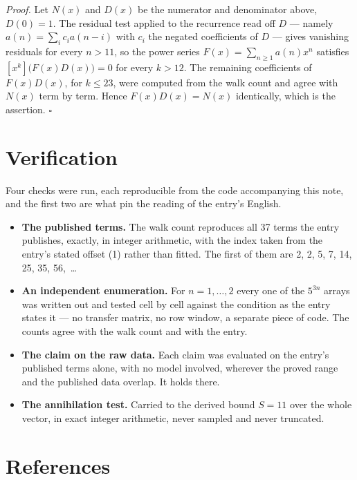 \documentclass[11pt]{article}
\theoremstyle{definition}
\begin{document}
{\itshape Proof.} Let $N(x)$ and $D(x)$ be the numerator and denominator above, $D(0)=1$. The residual test applied to the recurrence read off $D$ --- namely $a(n) = \sum_i c_i a(n-i)$ with $c_i$ the negated coefficients of $D$ --- gives vanishing residuals for every $n > 11$, so the power series $F(x)=\sum_{n\ge 1}a(n)x^n$ satisfies $[x^k]\bigl(F(x)D(x)\bigr) = 0$ for every $k > 12$. The remaining coefficients of $F(x)D(x)$, for $k \le 23$, were computed from the walk count and agree with $N(x)$ term by term. Hence $F(x)D(x) = N(x)$ identically, which is the assertion. $\square$

\section{Verification}

Four checks were run, each reproducible from the code accompanying this note, and the first two are what pin the reading of the entry's English.

\begin{itemize}

\item {\bfseries The published terms.} The walk count reproduces all 37 terms the entry publishes, exactly, in integer arithmetic, with the index taken from the entry's stated offset (1) rather than fitted. The first of them are 2, 2, 5, 7, 14, 25, 35, 56,~\dots

\item {\bfseries An independent enumeration.} For $n = 1,\dots,2$ every one of the $5^{3n}$ arrays was written out and tested cell by cell against the condition as the entry states it --- no transfer matrix, no row window, a separate piece of code. The counts agree with the walk count and with the entry.

\item {\bfseries The claim on the raw data.} Each claim was evaluated on the entry's published terms alone, with no model involved, wherever the proved range and the published data overlap. It holds there.

\item {\bfseries The annihilation test.} Carried to the derived bound $S = 11$ over the whole vector, in exact integer arithmetic, never sampled and never truncated.

\end{itemize}

\section{References}
\end{document}
